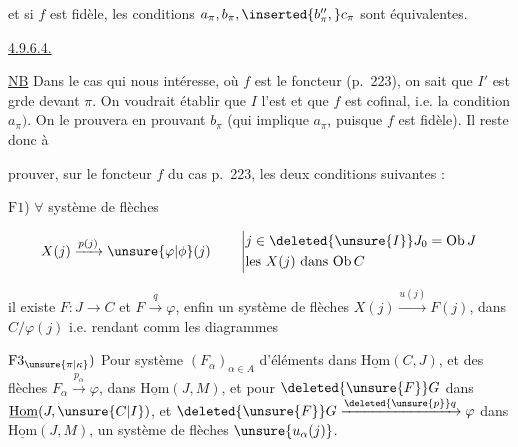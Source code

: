 et si $f$ est fidèle,  les   conditions $a_\pi,b_\pi,\inserted{b''_\pi,}c_\pi$ sont équivalentes.


\uline{4.9.6.4.}

\uline{NB} Dans le cas qui nous intéresse, où $f$ est le foncteur  (p.~223), on sait que $I'$ est grde devant $\pi$. On voudrait établir que $I$ l'est et que $f$ est cofinal, i.e. la condition $a_\pi)$. On  le prouvera en prouvant $b_\pi$ (qui implique $a_\pi$, puisque $f$ est fidèle). Il reste donc à


prouver, sur le foncteur $f$ du cas p.~223, les deux conditions suivantes :

$\mathrm{F}1$)  $\forall$ système  de flèches 

\[
X(j)\xrightarrow{p(j)}\unsure{\varphi|\phi}(j)
\qquad\left|\begin{aligned}
&j\in\deleted{\unsure{I}}J_0=\mathrm{Ob}\,J\\
&\text{les }X(j)\text{ dans }\mathrm{Ob}\,C
\end{aligned}\right.
\]

il existe  $F:J\longrightarrow C$ et $F\xrightarrow{q}\varphi$, enfin un système de flèches $X(j)\xrightarrow{u(j)}F(j)$,  dans  $C/\varphi(j)$ i.e. rendant comm les diagrammes 


$\mathrm{F}3_{\unsure{\pi|\kappa}})$ Pour  système $(F_\alpha)_{\alpha\in A}$   d'éléments dans  $\underline{\mathrm{Hom}}(C,J)$, et des flèches $F_\alpha\xrightarrow{p_\alpha}\varphi$, dans $\underline{\mathrm{Hom}}(J,M)$, et pour $\deleted{\unsure{F}}G$ dans $\underline{\mathrm{Hom}}(J,\unsure{C|I})$, et $\deleted{\unsure{F}}G\xrightarrow{\deleted{\unsure{p}}q}\varphi$ dans $\underline{\mathrm{Hom}}(J,M)$,  un système de flèches $\unsure{u_\alpha(j)}$.

